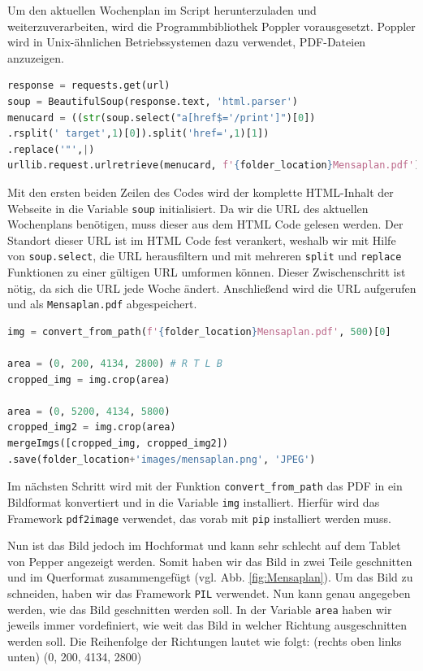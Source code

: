 Um den aktuellen Wochenplan im Script herunterzuladen und weiterzuverarbeiten, wird die Programmbibliothek Poppler vorausgesetzt. Poppler wird in Unix-ähnlichen Betriebssystemen dazu verwendet, PDF-Dateien anzuzeigen.\\

\begin{lstlisting}[language=Python]
response = requests.get(url)
soup = BeautifulSoup(response.text, 'html.parser')
menucard = ((str(soup.select("a[href$='/print']")[0])
.rsplit(' target',1)[0]).split('href=',1)[1])
.replace('"',|)
urllib.request.urlretrieve(menucard, f'{folder_location}Mensaplan.pdf')
\end{lstlisting}

Mit den ersten beiden Zeilen des Codes wird der komplette HTML-Inhalt der Webseite in die Variable \verb|soup| initialisiert. Da wir die URL des aktuellen Wochenplans benötigen, muss dieser aus dem HTML Code gelesen werden. Der Standort dieser URL ist im HTML Code fest verankert, weshalb wir mit Hilfe von \verb|soup.select|, die URL herausfiltern und mit mehreren \verb|split| und \verb|replace| Funktionen zu einer gültigen URL umformen können. Dieser Zwischenschritt ist nötig, da sich die URL jede Woche ändert. Anschließend wird die URL aufgerufen und als \verb|Mensaplan.pdf| abgespeichert.\\

\begin{lstlisting}[language=Python]
img = convert_from_path(f'{folder_location}Mensaplan.pdf', 500)[0]

area = (0, 200, 4134, 2800) # R T L B
cropped_img = img.crop(area)

area = (0, 5200, 4134, 5800)
cropped_img2 = img.crop(area)
mergeImgs([cropped_img, cropped_img2])
.save(folder_location+'images/mensaplan.png', 'JPEG')
\end{lstlisting}

Im nächsten Schritt wird mit der Funktion \verb|convert_from_path| das PDF in ein Bildformat konvertiert und in die Variable \verb|img| installiert. Hierfür wird das Framework \verb|pdf2image| verwendet, das vorab mit \verb|pip| installiert werden muss. 

Nun ist das Bild jedoch im Hochformat und kann sehr schlecht auf dem Tablet von Pepper angezeigt werden. Somit haben wir das Bild in zwei Teile geschnitten und im Querformat zusammengefügt (vgl. Abb. \ref{fig:Mensaplan}). Um das Bild zu schneiden, haben wir das Framework \verb|PIL| verwendet. Nun kann genau angegeben werden, wie das Bild geschnitten werden soll. In der Variable \verb|area| haben wir jeweils immer vordefiniert, wie weit das Bild in welcher Richtung ausgeschnitten werden soll. Die Reihenfolge der Richtungen lautet wie folgt: 
(rechts oben links unten) (0, 200, 4134, 2800)

